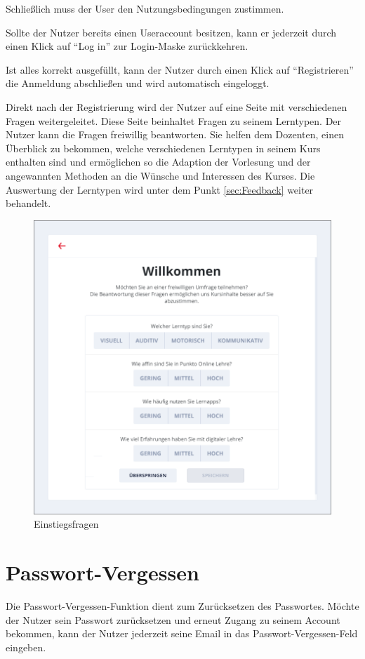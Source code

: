 Schließlich muss der User den Nutzungsbedingungen zustimmen.

Sollte der Nutzer bereits einen Useraccount besitzen, kann er jederzeit durch einen Klick auf \enquote{Log in} zur Login-Maske zurückkehren.

Ist alles korrekt ausgefüllt, kann der Nutzer durch einen Klick auf \enquote{Registrieren} die Anmeldung abschließen und wird automatisch eingeloggt.

Direkt nach der Registrierung wird der Nutzer auf eine Seite mit verschiedenen Fragen weitergeleitet. Diese Seite beinhaltet Fragen zu seinem Lerntypen. 
Der Nutzer kann die Fragen freiwillig beantworten. Sie helfen dem Dozenten, einen Überblick zu bekommen, welche verschiedenen Lerntypen in seinem Kurs enthalten sind und ermöglichen so die Adaption der Vorlesung und der angewannten Methoden an die Wünsche und Interessen des Kurses. Die Auswertung der Lerntypen wird unter dem Punkt \autoref{sec:Feedback} weiter behandelt.

\begin{figure}[h]
    \centering
    \includegraphics[width=.7\textwidth]{img/Einstiegsfragen.png}
    \caption{Einstiegsfragen}
    \label{fig:einstiegsfragen}
\end{figure}


\section{Passwort-Vergessen}\label{sec:passwordVergessen}
Die Passwort-Vergessen-Funktion dient zum Zurücksetzen des Passwortes.
Möchte der Nutzer sein Passwort zurücksetzen und erneut Zugang zu seinem Account bekommen, kann der Nutzer jederzeit seine Email in das Passwort-Vergessen-Feld eingeben.


